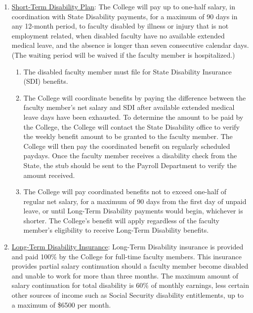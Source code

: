 				\begin{enumerate}[label=\alph*)]
					\item{\underline{Short-Term Disability Plan}:  The College will pay up to one-half salary, in coordination with State Disability payments, for a maximum of 90 days in any 12-month period, to faculty disabled by illness or injury that is not employment related, when disabled faculty have no available extended medical leave, and the absence is longer than seven consecutive calendar days.  (The waiting period will be waived if the faculty member is hospitalized.)
						\begin{enumerate}[label=\arabic*)]

							\item{The disabled faculty member must file for State Disability Insurance (SDI) benefits.}
							\item{The College will coordinate benefits by paying the difference between the faculty member's net salary and SDI after available extended medical leave days have been exhausted.  To determine the amount to be paid by the College, the College will contact the State Disability office to verify the weekly benefit amount to be granted to the faculty member.  The College will then pay the coordinated benefit on regularly scheduled paydays.  Once the faculty member receives a disability check from the State, the stub should be sent to the Payroll Department to verify the amount received.}
							\item{The College will pay coordinated benefits not to exceed one-half of regular net salary, for a maximum of 90 days from the first day of unpaid leave, or until Long-Term Disability payments would begin, whichever is shorter.  The College's benefit will apply regardless of the faculty member's eligibility to receive Long-Term Disability benefits.}
						\end{enumerate}
					}

					\item{\underline{Long-Term Disability Insurance}:  Long-Term Disability insurance is provided
						and paid 100\% by the College for full-time faculty members.  This insurance
						provides partial salary continuation should a faculty member become disabled and
						unable to work for more than three months.  The maximum amount of salary
						continuation for total disability is 60\% of monthly earnings, less certain other
						sources of income such as Social Security disability entitlements, up to a
						maximum of \$6500 per month.
						\begin{enumerate}[label=\arabic*)]


\end{enumerate}}
\end{enumerate}
